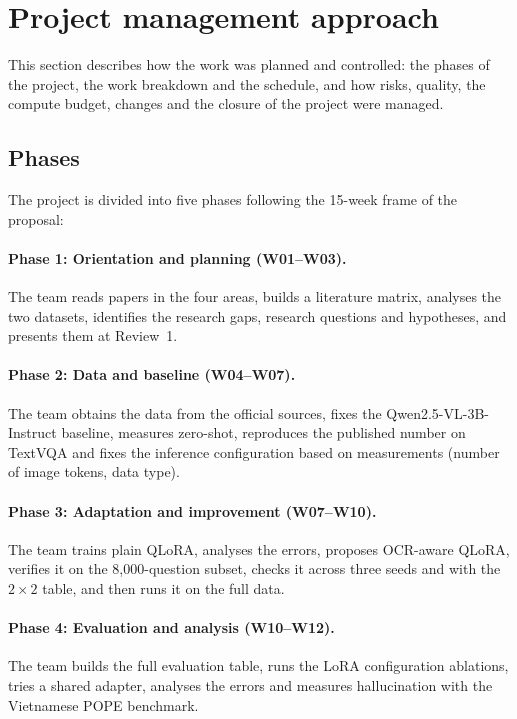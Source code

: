 \section{Project management approach}
\label{sec:intro-pm}

This section describes how the work was planned and controlled: the phases of the project,
the work breakdown and the schedule, and how risks, quality, the compute budget, changes and
the closure of the project were managed.

\subsection{Phases}

The project is divided into five phases following the 15-week frame of the proposal:

\paragraph{Phase 1: Orientation and planning (W01--W03).} The team reads papers in the
four areas, builds a literature matrix, analyses the two datasets, identifies the
research gaps, research questions and hypotheses, and presents them at Review~1.

\paragraph{Phase 2: Data and baseline (W04--W07).} The team obtains the data from the
official sources, fixes the Qwen2.5-VL-3B-Instruct baseline, measures zero-shot,
reproduces the published number on TextVQA and fixes the inference configuration
based on measurements (number of image tokens, data type).

\paragraph{Phase 3: Adaptation and improvement (W07--W10).} The team trains plain
QLoRA, analyses the errors, proposes OCR-aware QLoRA, verifies it on the
8,000-question subset, checks it across three seeds and with the $2\times2$ table, and
then runs it on the full data.

\paragraph{Phase 4: Evaluation and analysis (W10--W12).} The team builds the full
evaluation table, runs the LoRA configuration ablations, tries a shared adapter,
analyses the errors and measures hallucination with the Vietnamese POPE benchmark.

